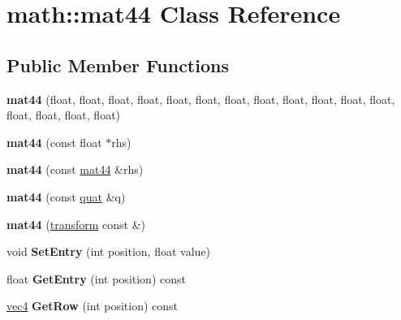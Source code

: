 \hypertarget{classmath_1_1mat44}{
\section{math::mat44 Class Reference}
\label{classmath_1_1mat44}
}
\subsection*{Public Member Functions}
\begin{DoxyCompactItemize}
\item 
\hypertarget{classmath_1_1mat44_ad2f0592f1325e5f8277a579cabf4ad04}{
{\bfseries mat44} (float, float, float, float, float, float, float, float, float, float, float, float, float, float, float, float)}
\label{classmath_1_1mat44_ad2f0592f1325e5f8277a579cabf4ad04}

\item 
\hypertarget{classmath_1_1mat44_a2a74779af758d41fec08e26ef003edf2}{
{\bfseries mat44} (const float $\ast$rhs)}
\label{classmath_1_1mat44_a2a74779af758d41fec08e26ef003edf2}

\item 
\hypertarget{classmath_1_1mat44_a271f125cc375924fd3d02c8e0628bb90}{
{\bfseries mat44} (const \hyperlink{classmath_1_1mat44}{mat44} \&rhs)}
\label{classmath_1_1mat44_a271f125cc375924fd3d02c8e0628bb90}

\item 
\hypertarget{classmath_1_1mat44_a6cc4afeed2fcd9fb308a7c8254422f95}{
{\bfseries mat44} (const \hyperlink{classmath_1_1quat}{quat} \&q)}
\label{classmath_1_1mat44_a6cc4afeed2fcd9fb308a7c8254422f95}

\item 
\hypertarget{classmath_1_1mat44_ae748e23517eec22c64bada077584771b}{
{\bfseries mat44} (\hyperlink{classmath_1_1transform}{transform} const \&)}
\label{classmath_1_1mat44_ae748e23517eec22c64bada077584771b}

\item 
\hypertarget{classmath_1_1mat44_a40b934de7d067301c6787b1edeaee87b}{
void {\bfseries SetEntry} (int position, float value)}
\label{classmath_1_1mat44_a40b934de7d067301c6787b1edeaee87b}

\item 
\hypertarget{classmath_1_1mat44_ae36ec40a70ae80bbd3f47d265df65e2b}{
float {\bfseries GetEntry} (int position) const }
\label{classmath_1_1mat44_ae36ec40a70ae80bbd3f47d265df65e2b}

\item 
\hypertarget{classmath_1_1mat44_aa550c86eecbf06d35e88fe80b36b6422}{
\hyperlink{classmath_1_1vec4}{vec4} {\bfseries GetRow} (int position) const }
\label{classmath_1_1mat44_aa550c86eecbf06d35e88fe80b36b6422}


\end{DoxyCompactItemize}
